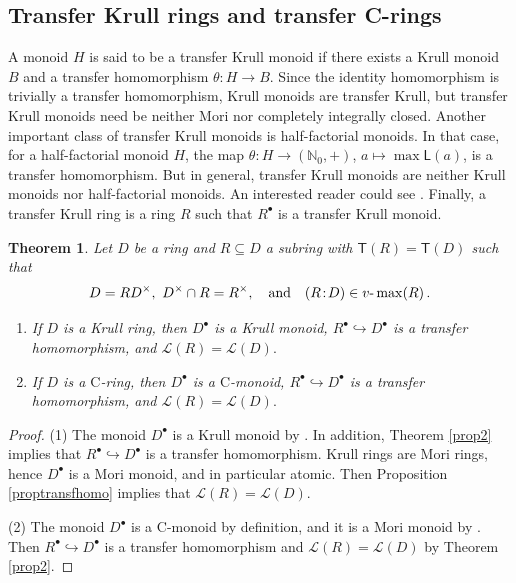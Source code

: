 \documentclass[a4paper, 10pt]{amsart}
\newcommand{\defit}[1]{{\textsf{#1}}}
\theoremstyle{plain}
\newtheorem{theorem}{Theorem}[section]
\theoremstyle{definition}
\theoremstyle{remark}
\newcommand{\DP}{\negthinspace : \negthinspace}
\numberwithin{equation}{section}
\begin{document}
\smallskip

\subsection{Transfer Krull rings and transfer C-rings} A monoid $H$ is said to be a \defit{transfer Krull monoid} if there exists a Krull monoid $B$ and a transfer homomorphism $\theta \colon H \to B$. Since the identity homomorphism is trivially a transfer homomorphism, Krull monoids are transfer Krull, but transfer Krull monoids need be neither Mori nor completely integrally closed. Another important class of transfer Krull monoids is half-factorial monoids. In that case, for a half-factorial monoid $H$, the map $\theta : H \to (\mathbb N_0, +)$, $a \mapsto \max \mathsf L(a)$, is a transfer homomorphism. But in general,
transfer Krull monoids are neither Krull monoids nor half-factorial monoids. An interested reader could see \cite{BR22}. Finally, a \defit{transfer Krull ring} is a ring $R$ such that $R^\bullet$ is a transfer Krull monoid.
\begin{theorem}\label{thm: transferkrull}
    Let $D$ be a ring and $R\subseteq D$ a subring with $\mathsf{T}(R)=\mathsf{T}(D)$ such that \[D = RD^{\times}, \  D^{\times} \cap R = R^{\times}, \quad \text{and} \quad { (R \DP D) \in v\text{-}\max (R)}  \,.\]
    \begin{enumerate}[label=\textup(\normalfont\arabic*\textup)]
        \item If $D$ is a Krull ring, then $D^\bullet$ is a Krull monoid, $R^\bullet \hookrightarrow D^\bullet$ is a transfer homomorphism, and $\mathcal{L}(R)=\mathcal{L}(D).$ 
        \item If $D$ is a $\mathrm{C}$-ring, then $D^\bullet$ is a $\mathrm{C}$-monoid, $R^\bullet \hookrightarrow D^\bullet$ is a transfer homomorphism, and $\mathcal{L}(R)=\mathcal{L}(D).$
    \end{enumerate}
\end{theorem}

\begin{proof}
    (1) The monoid $D^\bullet$ is a Krull monoid by \cite[Theorem 3.5(4)]{GRR15}. In addition, Theorem \ref{prop2} implies that $R^\bullet \hookrightarrow D^\bullet$ is a transfer homomorphism. Krull rings are Mori rings, hence $D^\bullet$ is a Mori monoid, and in particular atomic. Then Proposition \ref{proptransfhomo} implies that $\mathcal{L}(R)=\mathcal{L}(D).$ 

    (2) The monoid $D^\bullet$ is a C-monoid by definition, and it is a Mori monoid by \cite[Proposition 4.3]{GRR15}. Then $R^\bullet \hookrightarrow D^\bullet$ is a transfer homomorphism and $\mathcal{L}(R)=\mathcal{L}(D)$ by Theorem \ref{prop2}.
\end{proof}
\end{document}

